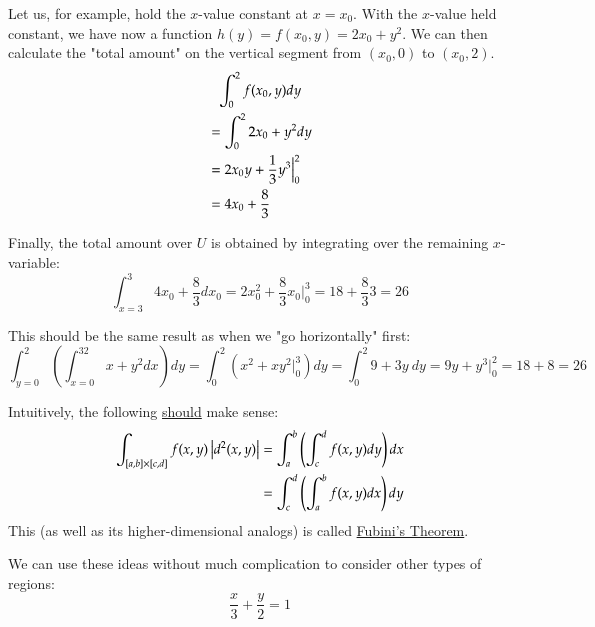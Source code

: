 \begin{center}
\end{center}
Let us, for example, hold the $x$-value constant at $x=x_0$. With the $x$-value held constant, we have now a function $h(y)=f(x_0,y)=2x_0+y^2$. We can then calculate the "total amount" on the vertical segment from $(x_0,0)$ to $(x_0,2)$. 
\begin{align*}
	&\hphantom{=}\int_0^2 f(x_0,y) dy \\
	&= \int_0^2 2x_0 + y^2 dy \\
	&= 2x_0y+\frac{1}{3}y^3 \Bigr\rvert_0^2 \\
	&= 4x_0+\frac{8}{3}
\end{align*}

Finally, the total amount over $U$ is obtained by integrating over the remaining $x$-variable: 
\[\int_{x=3}^3 4x_0 + \frac{8}{3} dx_0 = 2x_0^2 + \frac{8}{3} x_0 \Bigr\rvert_0^3=18+\frac{8}{3}3=26\]

This should be the same result as when we "go horizontally" first: 
\[\int_{y=0}^2\left(\int_{x=0}^32x+y^2 dx\right)dy=\int_{0}^2\left(x^2+xy^2\Bigr\rvert_0^3\right)dy=\int_0^2 9+3y\ dy=9y+y^3 \Bigr\rvert_0^2 =18+8=26\]

Intuitively, the following \ul{should} make sense: 
\begin{align*}
	\int_{[a,b]\times[c,d]} f(x,y) \left| d^2(x,y)\right| &=\int_a^b\left( \int_c^d f(x,y) dy \right)dx \\
	&=\int_c^d\left( \int_a^b f(x,y) dx \right)dy
\end{align*}
This (as well as its higher-dimensional analogs) is called \ul{Fubini's Theorem}. 

We can use these ideas without much complication to consider other types of regions:
\[\frac{x}{3}+\frac{y}{2}=1\]
\begin{center}
\end{center}